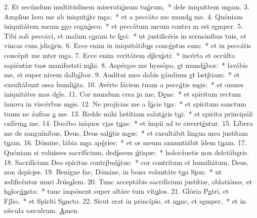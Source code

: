 2. Et secúndum multitúdinem miserati\uline{ó}num tu\uline{á}rum,~* dele iniquittem m\uline{e}am.
3. Amplius lava me ab iniquit\uline{á}te m\uline{e}a:~* et a peccáto me mund\uline{a} me.
4. Quóniam iniquitátem meam \uline{e}go cogn\uline{ó}sco:~* et peccátum meum contra m est s\uline{e}mper.
5. Tibi soli peccávi, et malum c\uline{o}ram te f\uline{e}ci:~* ut justificéris in sermónibus tuis, et vincas cum jdic\uline{á}ris.
6. Ecce enim in iniquitátib\uline{u}s conc\uline{é}ptus sum:~* et in peccátis concépit me mter m\uline{e}a.
7. Ecce enim veritátem d\uline{i}lex\uline{í}sti:~* incérta et occúlta sapiéntiæ tuæ manifeststi m\uline{i}hi.
8. Aspérges me hyssópo, \uline{e}t mund\uline{á}bor:~* lavábis me, et super nivem dalb\uline{á}bor.
9. Audítui meo dabis gáudium \uline{e}t læt\uline{í}tiam:~* et exsultábunt ossa humli\uline{á}ta.
10. Avérte fáciem tuam a pecc\uline{á}tis m\uline{e}is:~* et omnes iniquitátes mas d\uline{e}le.
11. Cor mundum crea \uline{i}n me, D\uline{e}us:~* et spíritum rectum ínnova in viscérbus m\uline{e}is.
12. Ne projícias me a f\uline{á}cie t\uline{u}a:~* et spíritum sanctum tuum ne áufras \uline{a} me.
13. Redde mihi lætítiam salut\uline{á}ris t\uline{u}i:~* et spíritu principáli cnfírm\uline{a} me.
14. Docébo iníquos v\uline{i}as t\uline{u}as:~* et ímpii ad te cnvert\uline{é}ntur.
15. Líbera me de sanguínibus, Deus, Deus sal\uline{ú}tis m\uline{e}æ:~* et exsultábit lingua mea justítam t\uline{u}am.
16. Dómine, lábia m\uline{e}a ap\uline{é}ries:~* et os meum annuntiábit ldem t\uline{u}am.
17. Quóniam si voluísses sacrifícium, ded\uline{í}ssem \uline{ú}tique:~* holocáustis non delctáb\uline{e}ris.
18. Sacrifícium Deo spíritus contr\uline{i}bul\uline{á}tus:~* cor contrítum et humiliátum, Deus, non dspíc\uline{i}es.
19. Benígne fac, Dómine, in bona voluntáte t\uline{u}a S\uline{i}on:~* ut ædificéntur muri Jrús\uline{a}lem.
20. Tunc acceptábis sacrifícium justítiæ, oblatiónes, et h\uline{o}loc\uline{áu}sta:~* tunc impónent super altáre tum vít\uline{u}los.
21. Glória P\uline{a}tri, et F\uline{í}lio,~* et Spiríti S\uline{a}ncto.
22. Sicut erat in princípio, et n\uline{u}nc, et s\uline{e}mper,~* et in sǽcula sæculrum. \uline{A}men.
